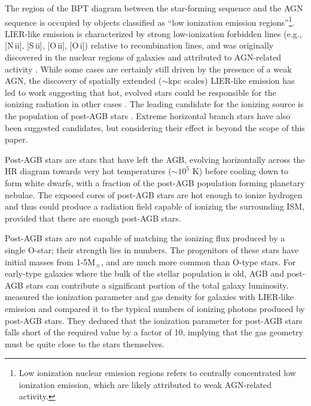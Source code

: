 \documentclass[linenumbers, tighten, trackchanges]{aastex61}%
\newcommand{\nii}{[N\,{\sc ii}]\xspace}
\newcommand{\sii}{[S\,{\sc ii}]\xspace}
\newcommand{\oii}{[O\,{\sc ii}]\xspace}
\newcommand{\oi}{[O\,{\sc i}]\xspace}
\newcommand\Msun{\ensuremath{\mathrm{M_{\sun}}}}
\begin{document}
The region of the BPT diagram between the star-forming sequence and the AGN sequence is occupied by objects classified as ``low ionization emission regions''\citep[LIERs, ][]{Belfiore16}\footnote{Low ionization nuclear emission regions \citep[LINERs, ][]{Heckman1980} refers to centrally concentrated low ionization emission, which are likely attributed to weak AGN-related activity.}. LIER-like emission is characterized by strong low-ionization forbidden lines (e.g., \nii{}, \sii{}, \oii{}, \oi{}) relative to recombination lines, and was originally discovered in the nuclear regions of galaxies and attributed to AGN-related activity \citep{Kauffmann03b, Kewley06, Ho08}. While some cases are certainly still driven by the presence of a weak AGN, the discovery of spatially extended (${\sim}$kpc scales) LIER-like emission has led to work suggesting that hot, evolved stars could be responsible for the ionizing radiation in other cases \citep{Singh13, Belfiore16}. The leading candidate for the ionizing source is the population of post-AGB stars \citep{Binette94, Sarzi10, Yan12}. Extreme horizontal branch stars have also been suggested candidates, but considering their effect is beyond the scope of this paper.

Post-AGB stars are stars that have left the AGB, evolving horizontally across the HR diagram towards very hot temperatures ($\sim10^5$ K) before cooling down to form white dwarfs, with a fraction of the post-AGB population forming planetary nebulae. The exposed cores of post-AGB stars are hot enough to ionize hydrogen and thus could produce a radiation field capable of ionizing the surrounding ISM, provided that there are enough post-AGB stars. 

Post-AGB stars are not capable of matching the ionizing flux produced by a single O-star; their strength lies in numbers. The progenitors of these stars have initial masses from 1-5\Msun{}, and are much more common than O-type stars. For early-type galaxies where the bulk of the stellar population is old, AGB and post-AGB stars can contribute a significant portion of the total galaxy luminosity. \citet{Yan12} measured the ionization parameter and gas density for galaxies with LIER-like emission and compared it to the typical numbers of ionizing photons produced by post-AGB stars. They deduced that the ionization parameter for post-AGB stars falls short of the required value by a factor of 10, implying that the gas geometry must be quite close to the stars themselves.
\end{document}
